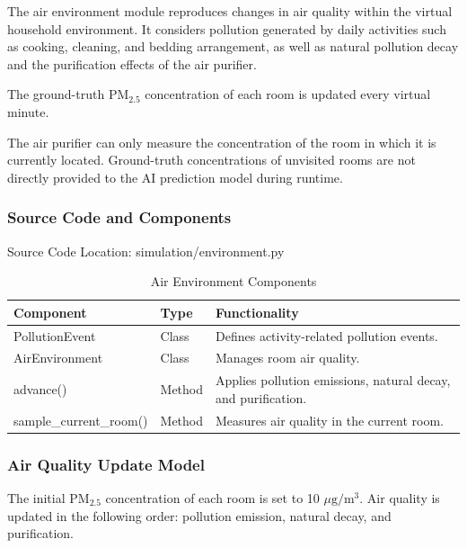 \documentclass[conference]{IEEEtran}
\newlength{\tablebodywidth}
\newcommand{\pmfine}{\ensuremath{\mathrm{PM}_{2.5}}}
\newcommand{\pmunit}{\ensuremath{\mu\mathrm{g}/\mathrm{m}^3}}
\begin{document}
The air environment module reproduces changes in air quality within the virtual household environment. It considers pollution generated by daily activities such as cooking, cleaning, and bedding arrangement, as well as natural pollution decay and the purification effects of the air purifier.

The ground-truth \pmfine{} concentration of each room is updated every virtual minute.

The air purifier can only measure the concentration of the room in which it is currently located. Ground-truth concentrations of unvisited rooms are not directly provided to the AI prediction model during runtime.

\subsubsection{Source Code and Components}

Source Code Location: simulation/environment.py

\begin{table}[!t]
\caption{Air Environment Components}
\label{tab:t18}
\centering\footnotesize
\setlength{\tabcolsep}{3pt}
\setlength{\tablebodywidth}{\dimexpr\columnwidth-18pt\relax}
\begin{tabular}{>{\raggedright\arraybackslash}p{0.370\tablebodywidth}>{\raggedright\arraybackslash}p{0.200\tablebodywidth}>{\raggedright\arraybackslash}p{0.430\tablebodywidth}}
\toprule
\textbf{Component} & \textbf{Type} & \textbf{Functionality} \\
\midrule
PollutionEvent & Class & Defines activity-related pollution events. \\
AirEnvironment & Class & Manages room air quality. \\
advance() & Method & Applies pollution emissions, natural decay, and purification. \\
sample\_\allowbreak{}current\_\allowbreak{}room() & Method & Measures air quality in the current room. \\
\bottomrule
\end{tabular}
\end{table}

\subsubsection{Air Quality Update Model}

The initial \pmfine{} concentration of each room is set to 10 \pmunit{}. Air quality is updated in the following order: pollution emission, natural decay, and purification.
\end{document}
